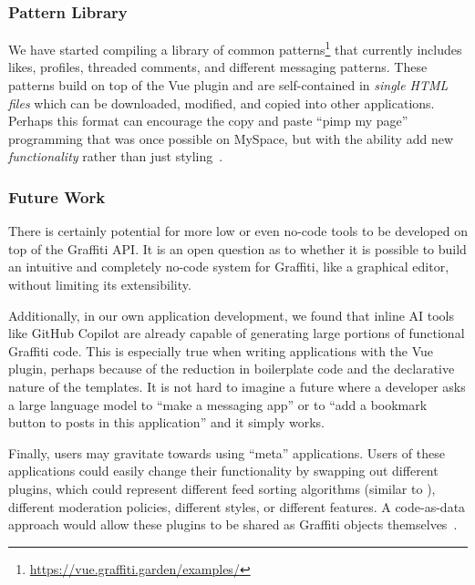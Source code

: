 \subsubsection{Pattern Library}

We have started compiling a library of common patterns\footnote{
    \url{https://vue.graffiti.garden/examples/}
} that currently includes likes, profiles, threaded comments,
and different messaging patterns.
These patterns build on top of the Vue plugin
and are self-contained in \emph{single HTML files}
which can be downloaded, modified, and copied into other
applications.
Perhaps this format can encourage the copy and paste ``pimp my page''
programming that was once possible on MySpace, but with the ability
add new \emph{functionality} rather than just styling~\cite{copypasteliteracy}.

\subsubsection{Future Work}
\label{above-and-below:above:future-work}

There is certainly potential for more low or even no-code tools
to be developed on top of the Graffiti API. It is an open
question as to whether it is possible to build an intuitive and completely
no-code system for Graffiti, like a graphical editor, without limiting
its extensibility.

Additionally, in our own application development,
we found that inline AI tools like GitHub Copilot are already
capable of generating large portions of functional Graffiti code.
This is especially true when writing applications with the
Vue plugin, perhaps because of the reduction in boilerplate
code and the declarative nature of the templates.
It is not hard to imagine a future where a developer asks
a large language model to ``make a messaging app''
or to ``add a bookmark button to posts in this application'' and
it simply works.

Finally, users may gravitate towards using ``meta'' applications.
Users of these applications could easily change their functionality
by swapping out different plugins,
which could represent different feed sorting algorithms
(similar to \cite{threeleggedstool, bluesky}),
different moderation policies, different styles,
or different features.
A code-as-data approach would allow these plugins to be shared
as Graffiti objects themselves~\cite{webstrates}.

